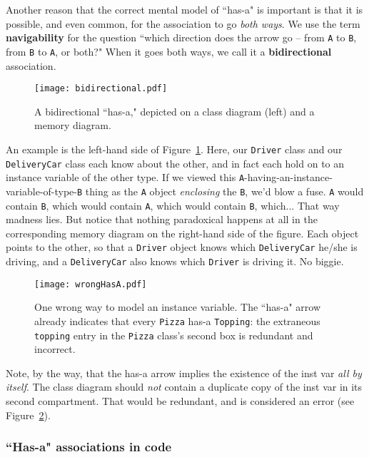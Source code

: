 Another reason that the correct mental model of ``has-a" is important is that
it is possible, and even common, for the association to go \textit{both ways}.
We use the term \textbf{navigability} for the question ``which direction does
the arrow go -- from \texttt{A} to \texttt{B}, from \texttt{B} to \texttt{A},
or both?" When it goes both ways, we call it a \textbf{bidirectional}
association.

\begin{figure}[ht]
\centering
\texttt{[image: bidirectional.pdf]}   %
\caption{A bidirectional ``has-a," depicted on a class diagram (left) and a
memory diagram.}
\label{fig:bidirectional}
\end{figure}

An example is the left-hand side of Figure~\ref{fig:bidirectional}. Here, our
\texttt{Driver} class and our \texttt{DeliveryCar} class each know about the
other, and in fact each hold on to an instance variable of the other type. If
we viewed this \texttt{A}-having-an-instance-variable-of-type-\texttt{B} thing
as the \texttt{A} object \textit{enclosing} the \texttt{B}, we'd blow a fuse.
\texttt{A} would contain \texttt{B}, which would contain \texttt{A}, which
would contain \texttt{B}, which... That way madness lies. But notice that
nothing paradoxical happens at all in the corresponding memory diagram on the
right-hand side of the figure. Each object points to the other, so that a
\texttt{Driver} object knows which \texttt{DeliveryCar} he/she is driving, and
a \texttt{DeliveryCar} also knows which \texttt{Driver} is driving it. No
biggie.

\begin{figure}[ht]
\centering
\texttt{[image: wrongHasA.pdf]}   %
\caption{One wrong way to model an instance variable. The ``has-a" arrow
already indicates that every \texttt{Pizza} has-a \texttt{Topping}: the
extraneous \texttt{topping} entry in the \texttt{Pizza} class's second box is
redundant and incorrect.}
\label{fig:wrongHasA}
\end{figure}

Note, by the way, that the has-a arrow implies the existence of the inst var
\textit{all by itself}. The class diagram should \textit{not} contain a
duplicate copy of the inst var in its second compartment. That would be
redundant, and is considered an error (see Figure~\ref{fig:wrongHasA}).

\pagebreak
\subsubsection{``Has-a" associations in code}

